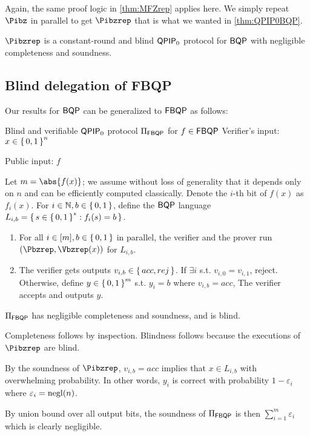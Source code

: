 Again, the same proof logic in \cref{thm:MFZrep} applies here. We simply repeat $\Pibz$ in parallel to get $\Pibzrep$ that is what we wanted in \cref{thm:QPIP0BQP}.

\begin{thm}
	\label{thm:QPIP0BQP}
	$\Pibzrep$ is a constant-round and blind $\operatorname{\mathsf{QPIP}}_0$ protocol for $\operatorname{\mathsf{BQP}}$ with negligible completeness and soundness.
\end{thm}

\subsection{Blind delegation of FBQP}

Our results for $\operatorname{\mathsf{BQP}}$ can be generalized to $\operatorname{\mathsf{FBQP}}$ as follows:

\begin{protocol}{Blind and verifiable $\operatorname{\mathsf{QPIP}}_0$ protocol $\Pi_{\operatorname{\mathsf{FBQP}}}$ for $f\in\operatorname{\mathsf{FBQP}}$}
	\label{proto:QPIP0FBQP}
	Verifier's input: $x\in\set{0, 1}^n$

	Public input: $f$

	Let $m=\abs{f(x)}$; we assume without loss of generality that it depends only on $n$ and can be efficiently computed classically.
	Denote the $i$-th bit of $f(x)$ as $f_i(x)$.
	For $i\in\mathbb{N}, b\in\set{0,1}$, define the $\operatorname{\mathsf{BQP}}$ language $L_{i, b}=\set{s\in\set{0,1}^* : f_i(s)=b}$.
	\begin{enumerate}
		\item For all $i\in[m], b\in\set{0, 1}$ in parallel, the verifier and the prover run $(\Pbzrep, \Vbzrep(x))$ for $L_{i, b}$.
		\item The verifier gets outputs $v_{i, b}\in\set{acc, rej}$.
			If $\exists i$ s.t. $v_{i,0}=v_{i,1}$, reject.
			Otherwise, define $y\in\set{0,1}^m$ s.t. $y_i = b$ where $v_{i, b}=acc$,
			The verifier accepts and outputs $y$.
	\end{enumerate}
\end{protocol}

\begin{theorem}
	$\Pi_{\operatorname{\mathsf{FBQP}}}$ has negligible completeness and soundness, and is blind.
\end{theorem}
\begin{prf}
	Completeness follows by inspection.
	Blindness follows because the executions of $\Pibzrep$ are blind.

	By the soundness of $\Pibzrep$, $v_{i, b}=acc$ implies that $x\in L_{i, b}$ with overwhelming probability.
	In other words, $y_i$ is correct with probability $1-\varepsilon_i$ where $\varepsilon_i=\operatorname{negl}(n)$. 
	
	By union bound over all output bits, the soundness of $\Pi_{\operatorname{\mathsf{FBQP}}}$ is then
	$\sum_{i=1}^m \varepsilon_i$
	which is clearly negligible.
\end{prf}
